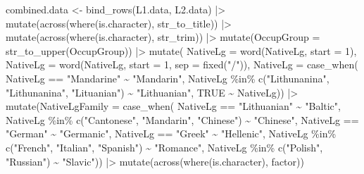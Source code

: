 \documentclass[
  letterpaper,
  DIV=11,
  numbers=noendperiod]{scrreprt}
\newenvironment{Shaded}{\begin{snugshade}}{\end{snugshade}}
\newcommand{\AttributeTok}[1]{\textcolor[rgb]{0.40,0.45,0.13}{#1}}
\newcommand{\ConstantTok}[1]{\textcolor[rgb]{0.56,0.35,0.01}{#1}}
\newcommand{\DecValTok}[1]{\textcolor[rgb]{0.68,0.00,0.00}{#1}}
\newcommand{\FunctionTok}[1]{\textcolor[rgb]{0.28,0.35,0.67}{#1}}
\newcommand{\NormalTok}[1]{\textcolor[rgb]{0.00,0.23,0.31}{#1}}
\newcommand{\OtherTok}[1]{\textcolor[rgb]{0.00,0.23,0.31}{#1}}
\newcommand{\SpecialCharTok}[1]{\textcolor[rgb]{0.37,0.37,0.37}{#1}}
\newcommand{\StringTok}[1]{\textcolor[rgb]{0.13,0.47,0.30}{#1}}
\begin{document}
\begin{Shaded}
\begin{Highlighting}[]
\NormalTok{combined.data }\OtherTok{\textless{}{-}} \FunctionTok{bind\_rows}\NormalTok{(L1.data, L2.data) }\SpecialCharTok{|\textgreater{}}
  \FunctionTok{mutate}\NormalTok{(}\FunctionTok{across}\NormalTok{(}\FunctionTok{where}\NormalTok{(is.character), str\_to\_title)) }\SpecialCharTok{|\textgreater{}}
  \FunctionTok{mutate}\NormalTok{(}\FunctionTok{across}\NormalTok{(}\FunctionTok{where}\NormalTok{(is.character), str\_trim)) }\SpecialCharTok{|\textgreater{}}
  \FunctionTok{mutate}\NormalTok{(}\AttributeTok{OccupGroup =} \FunctionTok{str\_to\_upper}\NormalTok{(OccupGroup)) }\SpecialCharTok{|\textgreater{}} 
  \FunctionTok{mutate}\NormalTok{(}
    \AttributeTok{NativeLg =} \FunctionTok{word}\NormalTok{(NativeLg, }\AttributeTok{start =} \DecValTok{1}\NormalTok{),}
    \AttributeTok{NativeLg =} \FunctionTok{word}\NormalTok{(NativeLg, }\AttributeTok{start =} \DecValTok{1}\NormalTok{, }\AttributeTok{sep =} \FunctionTok{fixed}\NormalTok{(}\StringTok{"/"}\NormalTok{)),}
    \AttributeTok{NativeLg =} \FunctionTok{case\_when}\NormalTok{(}
\NormalTok{      NativeLg }\SpecialCharTok{==} \StringTok{"Mandarine"} \SpecialCharTok{\textasciitilde{}} \StringTok{"Mandarin"}\NormalTok{,}
\NormalTok{      NativeLg }\SpecialCharTok{\%in\%} \FunctionTok{c}\NormalTok{(}\StringTok{"Lithunanina"}\NormalTok{, }\StringTok{"Lithunanina"}\NormalTok{, }\StringTok{"Lituanian"}\NormalTok{) }\SpecialCharTok{\textasciitilde{}} \StringTok{"Lithuanian"}\NormalTok{,}
      \ConstantTok{TRUE} \SpecialCharTok{\textasciitilde{}}\NormalTok{ NativeLg)) }\SpecialCharTok{|\textgreater{}} 
  \FunctionTok{mutate}\NormalTok{(}\AttributeTok{NativeLgFamily =} \FunctionTok{case\_when}\NormalTok{(}
\NormalTok{    NativeLg }\SpecialCharTok{==} \StringTok{"Lithuanian"} \SpecialCharTok{\textasciitilde{}} \StringTok{"Baltic"}\NormalTok{,}
\NormalTok{    NativeLg }\SpecialCharTok{\%in\%} \FunctionTok{c}\NormalTok{(}\StringTok{"Cantonese"}\NormalTok{, }\StringTok{"Mandarin"}\NormalTok{, }\StringTok{"Chinese"}\NormalTok{) }\SpecialCharTok{\textasciitilde{}} \StringTok{"Chinese"}\NormalTok{,}
\NormalTok{    NativeLg }\SpecialCharTok{==} \StringTok{"German"} \SpecialCharTok{\textasciitilde{}} \StringTok{"Germanic"}\NormalTok{,}
\NormalTok{    NativeLg }\SpecialCharTok{==} \StringTok{"Greek"} \SpecialCharTok{\textasciitilde{}} \StringTok{"Hellenic"}\NormalTok{,}
\NormalTok{    NativeLg }\SpecialCharTok{\%in\%} \FunctionTok{c}\NormalTok{(}\StringTok{"French"}\NormalTok{, }\StringTok{"Italian"}\NormalTok{, }\StringTok{"Spanish"}\NormalTok{) }\SpecialCharTok{\textasciitilde{}} \StringTok{"Romance"}\NormalTok{,}
\NormalTok{    NativeLg }\SpecialCharTok{\%in\%} \FunctionTok{c}\NormalTok{(}\StringTok{"Polish"}\NormalTok{, }\StringTok{"Russian"}\NormalTok{) }\SpecialCharTok{\textasciitilde{}} \StringTok{"Slavic"}\NormalTok{)) }\SpecialCharTok{|\textgreater{}} 
  \FunctionTok{mutate}\NormalTok{(}\FunctionTok{across}\NormalTok{(}\FunctionTok{where}\NormalTok{(is.character), factor))}
\end{Highlighting}
\end{Shaded}
\end{document}
